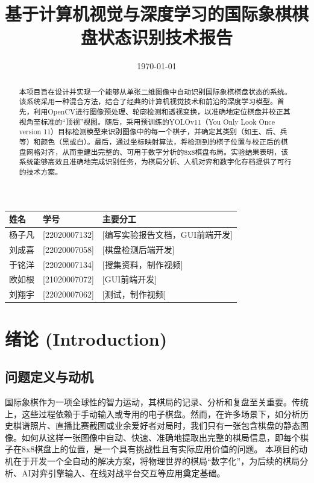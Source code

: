 \documentclass[12pt, a4paper]{article}
\title{\bfseries 基于计算机视觉与深度学习的国际象棋棋盘状态识别技术报告}
\author{}
\date{\today}
\begin{document}
\maketitle

\begin{center}
    \begin{tabular}{lll}
    \toprule
    \textbf{姓名} & \textbf{学号} & \textbf{主要分工} \\
    \midrule
    杨子凡 & [22020007132] & [编写实验报告文档，GUI前端开发] \\
    刘成喜 & [22020007058] & [棋盘检测后端开发] \\
    于铭洋 & [22020007134] & [搜集资料，制作视频] \\
    欧如根 & [21020007072] & [GUI前端开发] \\
    刘翔宇 & [22020007062] & [测试，制作视频] \\
    \bottomrule
    \end{tabular}
\end{center}

\thispagestyle{empty}
\newpage

\tableofcontents
\newpage

\setcounter{page}{1}

\begin{abstract}
    本项目旨在设计并实现一个能够从单张二维图像中自动识别国际象棋棋盘状态的系统。该系统采用一种混合方法，结合了经典的计算机视觉技术和前沿的深度学习模型。首先，利用OpenCV进行图像预处理、轮廓检测和透视变换，以准确地定位棋盘并校正其视角至标准的“顶视”视图。随后，采用预训练的YOLOv11（You Only Look Once version 11）目标检测模型来识别图像中的每一个棋子，并确定其类别（如王、后、兵等）和颜色（黑或白）。最后，通过坐标映射算法，将检测到的棋子位置与校正后的棋盘网格对齐，从而重建出完整的、可用于数字分析的8x8棋盘布局。实验结果表明，该系统能够高效且准确地完成识别任务，为棋局分析、人机对弈和数字化存档提供了可行的技术方案。
\end{abstract}

\section{绪论 (Introduction)}

\subsection{问题定义与动机}
国际象棋作为一项全球性的智力运动，其棋局的记录、分析和复盘至关重要。传统上，这些过程依赖于手动输入或专用的电子棋盘。然而，在许多场景下，如分析历史棋谱照片、直播比赛截图或业余爱好者对局时，我们只有一张包含棋盘的静态图像。如何从这样一张图像中自动、快速、准确地提取出完整的棋局信息，即每个棋子在8x8棋盘上的位置，是一个具有挑战性且有实际应用价值的问题。
本项目的动机在于开发一个全自动的解决方案，将物理世界的棋局“数字化”，为后续的棋局分析、AI对弈引擎输入、在线对战平台交互等应用奠定基础。
\end{document}
